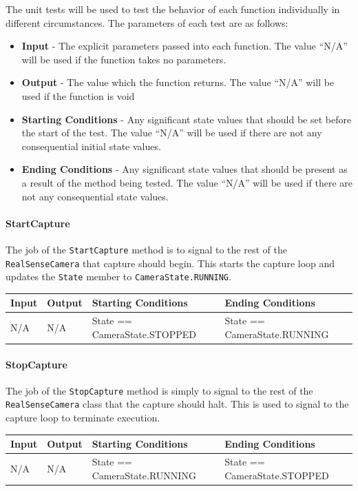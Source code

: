 \documentclass[12pt]{article}
\providecommand{\tightlist}{%
  \setlength{\itemsep}{0pt}\setlength{\parskip}{0pt}}
\begin{document}
The unit tests will be used to test the behavior of each function
individually in different circumstances. The parameters of each test are
as follows:

\begin{itemize}
\tightlist
\item
  \textbf{Input} - The explicit parameters passed into each function.
  The value ``N/A'' will be used if the function takes no parameters.
\item
  \textbf{Output} - The value which the function returns. The value
  ``N/A'' will be used if the function is void
\item
  \textbf{Starting Conditions} - Any significant state values that
  should be set before the start of the test. The value ``N/A'' will be
  used if there are not any consequential initial state values.
\item
  \textbf{Ending Conditions} - Any significant state values that should
  be present as a result of the method being tested. The value ``N/A''
  will be used if there are not any consequential state values.
\end{itemize}

\paragraph{StartCapture}\label{startcapture-1}

The job of the \texttt{StartCapture} method is to signal to the rest of
the \texttt{RealSenseCamera} that capture should begin. This starts the
capture loop and updates the \texttt{State} member to
\texttt{CameraState.RUNNING}.

\begin{longtable}[]{@{}llll@{}}
\toprule
Input & Output & Starting Conditions & Ending Conditions\tabularnewline
\midrule
\endhead
N/A & N/A & State == CameraState.STOPPED & State ==
CameraState.RUNNING\tabularnewline
\bottomrule
\end{longtable}

\paragraph{StopCapture}\label{stopcapture-1}

The job of the \texttt{StopCapture} method is simply to signal to the
rest of the \texttt{RealSenseCamera} class that the capture should halt.
This is used to signal to the capture loop to terminate execution.

\begin{longtable}[]{@{}llll@{}}
\toprule
Input & Output & Starting Conditions & Ending Conditions\tabularnewline
\midrule
\endhead
N/A & N/A & State == CameraState.RUNNING & State ==
CameraState.STOPPED\tabularnewline
\bottomrule
\end{longtable}
\end{document}
